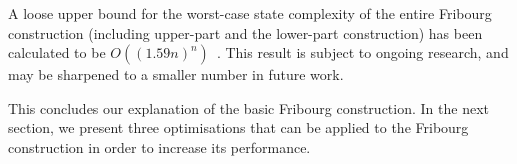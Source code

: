 




A loose upper bound for the worst-case state complexity of the entire Fribourg construction (including upper-part and the lower-part construction) has been calculated to be $O((1.59n)^n)$~\cite{2014_joel_ulrich}. This result is subject to ongoing research, and may be sharpened to a smaller number in future work.

This concludes our explanation of the basic Fribourg construction. In the next section, we present three optimisations that can be applied to the Fribourg construction in order to increase its performance. 


